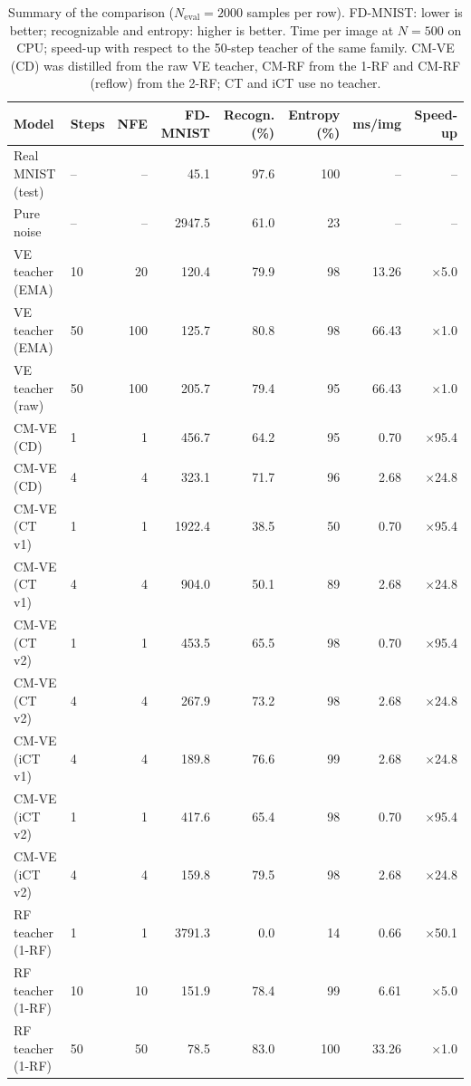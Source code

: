 \documentclass{article}
\begin{document}
\begin{table}[!htbp]
  \caption{Summary of the comparison ($N_\text{eval} = 2000$ samples per row).
  FD-MNIST: lower is better; recognizable and entropy: higher is better.
  Time per image at $N = 500$ on CPU; speed-up with respect to the 50-step
  teacher of the same family. CM-VE (CD) was distilled from the raw VE
  teacher, CM-RF from the 1-RF and CM-RF (reflow) from the 2-RF; CT and iCT
  use no teacher.}
  \label{tab:summary}
  \centering
  \footnotesize
  \begin{tabular}{llrrrrrr}
    \toprule
    Model & Steps & NFE & FD-MNIST & Recogn. (\%) & Entropy (\%) & ms/img & Speed-up \\
    \midrule
    Real MNIST (test) & -- & -- & 45.1 & 97.6 & 100 & -- & -- \\
    Pure noise & -- & -- & 2947.5 & 61.0 & 23 & -- & -- \\
    \midrule
    VE teacher (EMA) & 10 & 20 & 120.4 & 79.9 & 98 & 13.26 & $\times$5.0 \\
    VE teacher (EMA) & 50 & 100 & 125.7 & 80.8 & 98 & 66.43 & $\times$1.0 \\
    VE teacher (raw) & 50 & 100 & 205.7 & 79.4 & 95 & 66.43 & $\times$1.0 \\
    \midrule
    CM-VE (CD) & 1 & 1 & 456.7 & 64.2 & 95 & 0.70 & $\times$95.4 \\
    CM-VE (CD) & 4 & 4 & 323.1 & 71.7 & 96 & 2.68 & $\times$24.8 \\
    \midrule
    CM-VE (CT v1) & 1 & 1 & 1922.4 & 38.5 & 50 & 0.70 & $\times$95.4 \\
    CM-VE (CT v1) & 4 & 4 & 904.0 & 50.1 & 89 & 2.68 & $\times$24.8 \\
    CM-VE (CT v2) & 1 & 1 & 453.5 & 65.5 & 98 & 0.70 & $\times$95.4 \\
    CM-VE (CT v2) & 4 & 4 & 267.9 & 73.2 & 98 & 2.68 & $\times$24.8 \\
    CM-VE (iCT v1) & 4 & 4 & 189.8 & 76.6 & 99 & 2.68 & $\times$24.8 \\
    CM-VE (iCT v2) & 1 & 1 & 417.6 & 65.4 & 98 & 0.70 & $\times$95.4 \\
    CM-VE (iCT v2) & 4 & 4 & 159.8 & 79.5 & 98 & 2.68 & $\times$24.8 \\
    \midrule
    RF teacher (1-RF) & 1 & 1 & 3791.3 & 0.0 & 14 & 0.66 & $\times$50.1 \\
    RF teacher (1-RF) & 10 & 10 & 151.9 & 78.4 & 99 & 6.61 & $\times$5.0 \\
    RF teacher (1-RF) & 50 & 50 & 78.5 & 83.0 & 100 & 33.26 & $\times$1.0 \\

\end{tabular}
\end{table}
\end{document}
